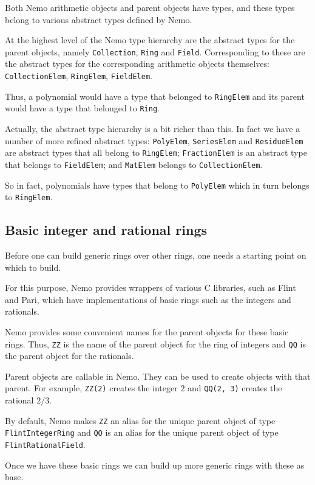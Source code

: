 \documentclass[a4paper,10pt]{article}
\newcommand{\code}{\lstinline}
\begin{document}
Both Nemo arithmetic objects and parent objects have types, and these types belong to various abstract
types defined by Nemo.

At the highest level of the Nemo type hierarchy are the abstract types for the parent objects, namely
\code{Collection}, \code{Ring} and \code{Field}. Corresponding to these are the abstract types for the
corresponding arithmetic objects themselves: \code{CollectionElem}, \code{RingElem}, \code{FieldElem}.

Thus, a polynomial would have a type that belonged to \code{RingElem} and its parent would have a type
that belonged to \code{Ring}.

Actually, the abstract type hierarchy is a bit richer than this. In fact we have a number of more
refined abstract types: \code{PolyElem}, \code{SeriesElem} and \code{ResidueElem} are abstract types
that all belong to \code{RingElem}; \code{FractionElem} is an abstract type that belongs to
\code{FieldElem}; and \code{MatElem} belongs to \code{CollectionElem}.

So in fact, polynomials have types that belong to \code{PolyElem} which in turn belongs to
\code{RingElem}.

\subsection{Basic integer and rational rings}

Before one can build generic rings over other rings, one needs a starting point on which to build.

For this purpose, Nemo provides wrappers of various C libraries, such as Flint and Pari, which have
implementations of basic rings such as the integers and rationals.

Nemo provides some convenient names for the parent objects for these basic rings. Thus, \code{ZZ} is
the name of the parent object for the ring of integers and \code{QQ} is the parent object for the
rationals.

Parent objects are callable in Nemo. They can be used to create objects with that parent. For example,
\code{ZZ(2)} creates the integer $2$ and \code{QQ(2, 3)} creates the rational $2/3$.

By default, Nemo makes \code{ZZ} an alias for the unique parent object of type \code{FlintIntegerRing}
and \code{QQ} is an alias for the unique parent object of type \code{FlintRationalField}.

Once we have these basic rings we can build up more generic rings with these as base.
\end{document}
